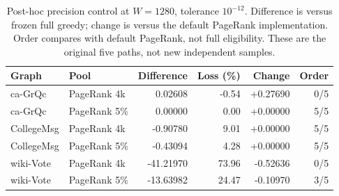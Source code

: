 \begin{table}[htbp]
\caption{Post-hoc precision control at $W=1280$, tolerance $10^{-12}$. Difference is versus frozen full greedy; change is versus the default PageRank implementation. Order compares with default PageRank, not full eligibility. These are the original five paths, not new independent samples.}\label{tab:precision}
\begin{tabular}{llrrrr}
\toprule
Graph & Pool & Difference & Loss (\%) & Change & Order \\
\midrule
ca-GrQc & PageRank 4k & 0.02608 & -0.54 & +0.27690 & 0/5 \\
ca-GrQc & PageRank 5\% & 0.00000 & 0.00 & +0.00000 & 5/5 \\
CollegeMsg & PageRank 4k & -0.90780 & 9.01 & +0.00000 & 5/5 \\
CollegeMsg & PageRank 5\% & -0.43094 & 4.28 & +0.00000 & 5/5 \\
wiki-Vote & PageRank 4k & -41.21970 & 73.96 & -0.52636 & 0/5 \\
wiki-Vote & PageRank 5\% & -13.63982 & 24.47 & -0.10970 & 3/5 \\
\bottomrule
\end{tabular}
\end{table}
